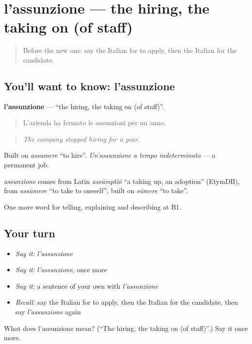 \section[l'assunzione]{l'assunzione — the hiring, the taking on (of staff)}

\label{lesson:IT-C356-assunzione}



\begin{quote}
Before the new one: say the Italian for to apply, then the Italian for the candidate.
\end{quote}

\subsection*{You'll want to know: l'assunzione}
\textbf{l'assunzione} — \textquotedblleft{}the hiring, the taking on (of staff)\textquotedblright{}.

\begin{quote}
L'azienda ha fermato le assunzioni per un anno.
\end{quote}

\begin{quote}
\emph{The company stopped hiring for a year.}
\end{quote}

Built on \emph{assumere} \textquotedblleft{}to hire\textquotedblright{}. \emph{Un'assunzione a tempo indeterminato} — a permanent job.

\begin{cousinweb}
\emph{assunzione} comes from Latin \emph{assūmptiō} \textquotedblleft{}a taking up, an adoption\textquotedblright{} (EtymDB), from \emph{assūmere} \textquotedblleft{}to take to oneself\textquotedblright{}, built on \emph{sūmere} \textquotedblleft{}to take\textquotedblright{}.
\end{cousinweb}

\begin{grammarlens}[title={What you've built}]
One more word for telling, explaining and describing at B1.
\end{grammarlens}

\subsection*{Your turn}
\begin{itemize}
\raggedright
  \item \emph{Say it:} \emph{l'assunzione}
  \item \emph{Say it:} \emph{l'assunzione}, once more
  \item \emph{Say it:} a sentence of your own with \emph{l'assunzione}
  \item \emph{Recall:} say the Italian for to apply, then the Italian for the candidate, then say \emph{l'assunzione} again
\end{itemize}

\begin{tcolorbox}[breakable,colback=teal!4,colframe=teal!35!black,title={Before you move on}]
What does l'assunzione mean? (\textquotedblleft{}The hiring, the taking on (of staff)\textquotedblright{}.) Say it once more.
\end{tcolorbox}
